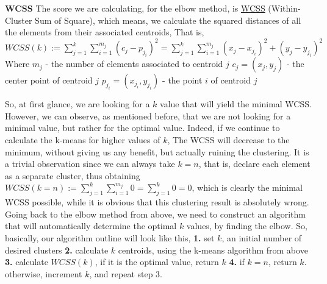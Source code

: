 \documentclass[12pt]{article}
\begin{document}
\textbf{WCSS} \newline
The score we are calculating, for the elbow method, is \underline{WCSS} (Within-Cluster Sum of Square), \newline
which means, we calculate the squared distances of all the elements from their associated centroids, \newline
That is, \newline
\( WCSS(k):= \sum_{j=1}^{k} \sum_{i=1}^{m_j} (c_j - p_{j_i})^2=\sum_{j=1}^{k} \sum_{i=1}^{m_j} (x_j - x_{j_i})^2+(y_j - y_{j_i})^2 \) \newline
Where \newline
$m_j$ - the number of elements associated to centroid \( j \) \newline
$c_j=(x_j,y_j)$ - the center point of centroid \( j \) \newline
$p_{j_i}=(x_{j_i},y_{j_i})$ - the point $i$ of centroid \( j \) \newline

So, at first glance, we are looking for a \( k \) value that will yield the minimal WCSS. \newline
However, we can observe, as mentioned before, that we are not looking for a minimal value, but rather 
for the optimal value. Indeed, if we continue to calculate the k-means for higher values of \( k \), \newline
The WCSS will decrease to the minimum, without giving us any benefit, but actually ruining the clustering. \newline
It is a trivial observation since we can always take \( k=n \), that is, declare each element as a separate cluster, thus obtaining  \( WCSS(k=n):= \sum_{j=1}^{k} \sum_{i=1}^{m_j} 0=\sum_{j=1}^{k} 0=0 \),
\newline
which is clearly the minimal WCSS possible, while it is obvious that this clustering result is absolutely wrong. \newline
Going back to the elbow method from above, we need to construct an algorithm that will automatically determine the optimal \( k \) values, by finding the elbow. So, basically, our algorithm outline will look like this, \newline
\textbf{1.} set $k$, an initial number of desired clusters \newline
\textbf{2.} calculate $k$ centroids, using the k-means algorithm from above \newline
\textbf{3.} calculate $WCSS(k)$, if it is the optimal value, return $k$ \newline
\textbf{4.} if $k=n$, return $k$. otherwise, increment $k$, and repeat step 3. \newline
\end{document}
